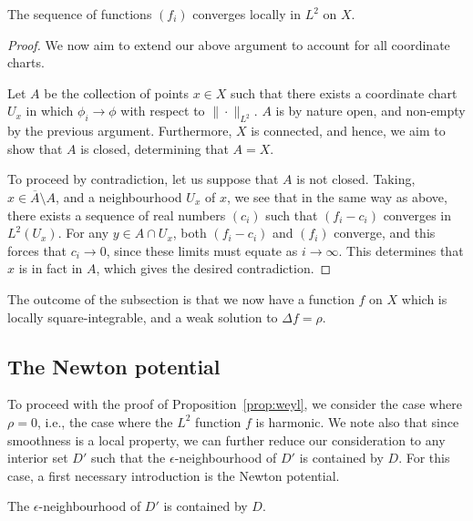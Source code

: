 \begin{lemma}
	The sequence of functions $ ( f_{i} ) $ converges locally in $ L^{2} $ on $ X $.
	\begin{proof}
		We now aim to extend our above argument to account for all coordinate
		charts.

		Let $ A $ be the collection of points $ x \in X $ such that there exists a
		coordinate chart $ U_{x} $ in which $ \phi_{i}\to \phi$ with respect to $
			\|\cdot \|_{L^{2}} $. $ A $ is by nature open, and non-empty by the previous
		argument. Furthermore, $ X $ is connected, and hence, we aim to show that $
			A $ is closed, determining that $ A=X $.

		To proceed by contradiction, let us suppose that $ A $ is not closed.
		Taking, $ x \in \overline{A}\setminus A $, and a neighbourhood $ U_{x} $ of
		$ x $, we see that in the same way as above, there exists a sequence of real
		numbers $ ( c_{i} ) $ such that $ ( f_{i}-c_{i} ) $ converges in $ L^{2}(
			U_{x} ) $. For any $ y \in A \cap U_{x} $, both $ ( f_{i}-c_{i} ) $ and $
			( f_{i} )$ converge, and this forces that $ c_{i}\to 0 $, since these
		limits must equate as $ i \to \infty $. This determines that $ x $ is in
		fact in $ A $, which gives the desired contradiction.
	\end{proof}
\end{lemma}

The outcome of the subsection is that we now have a function $ f $ on $ X $
which is locally square-integrable, and a weak solution to $ \Delta f = \rho $.

\subsection{The Newton potential}
To proceed with the proof of Proposition~\ref{prop:weyl}, we consider the case
where $ \rho=0 $, i.e., the case where the $ L^{2} $ function $ f $ is
harmonic. We note also that since smoothness is a local
property, we can further reduce
our consideration to any interior set $ D' $ such that the $ \epsilon
$-neighbourhood of $ D' $ is contained by $ D $. For this case, a first
necessary introduction is the Newton potential.

\begin{marginfigure}[-2\baselineskip]
	\centering
	\caption{The $ \epsilon $-neighbourhood of $ D' $ is contained by $ D $.}
\end{marginfigure}

